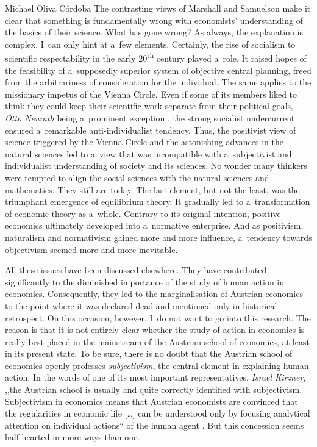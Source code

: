 \begin{artengenv}{Michael Oliva Córdoba}
The contrasting views of Marshall and Samuelson make it clear that something is fundamentally wrong with economists' understanding of the basics of their science. What has gone wrong? As always, the explanation is complex. I~can only hint at a~few elements. Certainly, the rise of socialism to scientific respectability in the early 20\textsuperscript{th} century played a~role. It raised hopes of the feasibility of a~supposedly superior system of objective central planning, freed from the arbitrariness of consideration for the individual. The same applies to the missionary impetus of the Vienna Circle. Even if some of its members liked to think they could keep their scientific work separate from their political goals, \textit{Otto Neurath} being a~prominent exception 
\parencites[cf.][p.23]{richardson_left_2009}[][p.23]{schilpp_intellectual_1963}, %
 the strong socialist undercurrent ensured a~remarkable anti-individualist tendency. Thus, the positivist view of science triggered by the Vienna Circle and the astonishing advances in the natural sciences led to a~view that was incompatible with a~subjectivist and individualist understanding of society and its sciences. No wonder many thinkers were tempted to align the social sciences with the natural sciences and mathematics. They still are today. The last element, but not the least, was the triumphant emergence of equilibrium theory. It gradually led to a~transformation of economic theory as a~whole. Contrary to its original intention, positive economics ultimately developed into a~normative enterprise. And as positivism, naturalism and normativism gained more and more influence, a~tendency towards objectivism seemed more and more inevitable.



All these issues have been discussed elsewhere. They have contributed significantly to the diminished importance of the study of human action in economics. Consequently, they led to the marginalisation of Austrian economics to the point where it was declared dead and mentioned only in historical retrospect. On this occasion, however, I~do not want to go into this research. The reason is that it is not entirely clear whether the study of action in economics is really best placed in the mainstream of the Austrian school of economics, at least in its present state. To be sure, there is no doubt that the Austrian school of economics openly professes \textit{subjectivism}, the central element in explaining human action. In the words of one of its most important representatives, \textit{Israel Kirzner}, ,,the Austrian school is usually and quite correctly identified with subjectivism. Subjectivism in economics means that Austrian economists are convinced that the regularities in economic life […] can be understood only by focusing analytical attention on individual actions`` of the human agent 
\parencite[][p.2:12]{kirzner_history_2016}. %
 But this concession seems half-hearted in more ways than one.




\end{artengenv}
